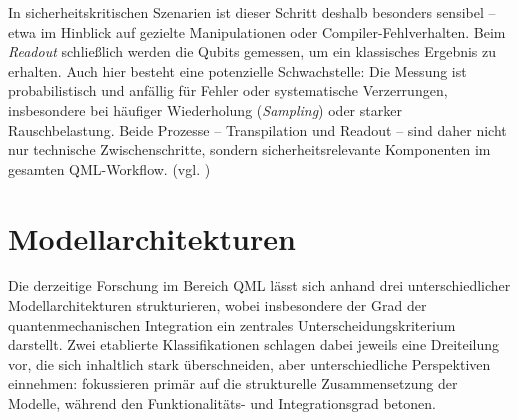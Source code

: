 In sicherheitskritischen Szenarien ist dieser Schritt deshalb besonders sensibel – etwa im Hinblick auf gezielte Manipulationen oder Compiler-Fehlverhalten. Beim \textit{Readout} schließlich werden die Qubits gemessen, um ein klassisches Ergebnis zu erhalten. Auch hier besteht eine potenzielle Schwachstelle: Die Messung ist probabilistisch und anfällig für Fehler oder systematische Verzerrungen, insbesondere bei häufiger Wiederholung (\textit{Sampling}) oder starker Rauschbelastung. Beide Prozesse – Transpilation und Readout – sind daher nicht nur technische Zwischenschritte, sondern sicherheitsrelevante Komponenten im gesamten QML-Workflow. (vgl. \cite{willeIBMsQiskitTool2019})




\section{Modellarchitekturen}

Die derzeitige Forschung im Bereich QML lässt sich anhand drei unterschiedlicher Modellarchitekturen strukturieren, wobei insbesondere der Grad der quantenmechanischen Integration ein zentrales Unterscheidungskriterium darstellt. Zwei etablierte Klassifikationen
schlagen dabei jeweils eine Dreiteilung vor, die sich inhaltlich stark überschneiden, aber unterschiedliche Perspektiven einnehmen: \cite{chengNoisyIntermediatescaleQuantum2023} fokussieren primär auf die strukturelle Zusammensetzung der Modelle, während \cite{mitarai_k_et_al_quantum_2018} den Funktionalitäts- und Integrationsgrad betonen.

